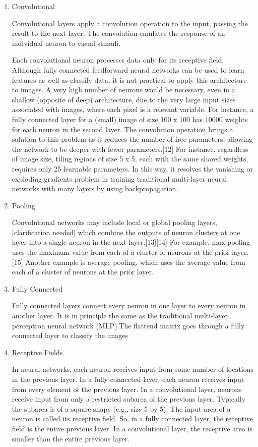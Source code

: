 \documentclass[12pt,a4paper]{article}
\begin{document}
\par
\begin{enumerate}
\item Convolutional 
\par 
Convolutional layers apply a convolution operation to the input, passing the result to the next layer. The convolution emulates the response of an individual neuron to visual stimuli.

Each convolutional neuron processes data only for its receptive field. Although fully connected feedforward neural networks can be used to learn features as well as classify data, it is not practical to apply this architecture to images. A very high number of neurons would be necessary, even in a shallow (opposite of deep) architecture, due to the very large input sizes associated with images, where each pixel is a relevant variable. For instance, a fully connected layer for a (small) image of size 100 x 100 has 10000 weights for each neuron in the second layer. The convolution operation brings a solution to this problem as it reduces the number of free parameters, allowing the network to be deeper with fewer parameters.[12] For instance, regardless of image size, tiling regions of size 5 x 5, each with the same shared weights, requires only 25 learnable parameters. In this way, it resolves the vanishing or exploding gradients problem in training traditional multi-layer neural networks with many layers by using backpropagation..
\item Pooling 
\par 
Convolutional networks may include local or global pooling layers,[clarification needed] which combine the outputs of neuron clusters at one layer into a single neuron in the next layer.[13][14] For example, max pooling uses the maximum value from each of a cluster of neurons at the prior layer.[15] Another example is average pooling, which uses the average value from each of a cluster of neurons at the prior layer.
\item Fully Connected
\par 
Fully connected layers connect every neuron in one layer to every neuron in another layer. It is in principle the same as the traditional multi-layer perceptron neural network (MLP).The flattend matrix goes through a fully connected layer to classify the images 
\newpage
\item Receptive Fields
\par 
In neural networks, each neuron receives input from some number of locations in the previous layer. In a fully connected layer, each neuron receives input from every element of the previous layer. In a convolutional layer, neurons receive input from only a restricted subarea of the previous layer. Typically the subarea is of a square shape (e.g., size 5 by 5). The input area of a neuron is called its receptive field. So, in a fully connected layer, the receptive field is the entire previous layer. In a convolutional layer, the receptive area is smaller than the entire previous layer. 
\end{enumerate}
\end{document}
